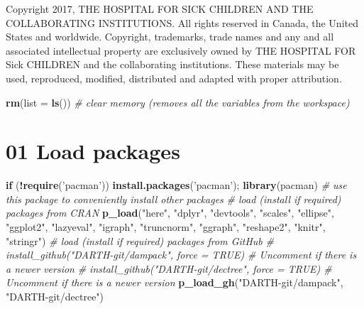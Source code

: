 \documentclass[
]{article}
\newenvironment{Shaded}{\begin{snugshade}}{\end{snugshade}}
\newcommand{\CommentTok}[1]{\textcolor[rgb]{0.56,0.35,0.01}{\textit{#1}}}
\newcommand{\ControlFlowTok}[1]{\textcolor[rgb]{0.13,0.29,0.53}{\textbf{#1}}}
\newcommand{\DataTypeTok}[1]{\textcolor[rgb]{0.13,0.29,0.53}{#1}}
\newcommand{\KeywordTok}[1]{\textcolor[rgb]{0.13,0.29,0.53}{\textbf{#1}}}
\newcommand{\NormalTok}[1]{#1}
\newcommand{\OperatorTok}[1]{\textcolor[rgb]{0.81,0.36,0.00}{\textbf{#1}}}
\newcommand{\StringTok}[1]{\textcolor[rgb]{0.31,0.60,0.02}{#1}}
\begin{document}
Copyright 2017, THE HOSPITAL FOR SICK CHILDREN AND THE COLLABORATING
INSTITUTIONS. All rights reserved in Canada, the United States and
worldwide. Copyright, trademarks, trade names and any and all associated
intellectual property are exclusively owned by THE HOSPITAL FOR Sick
CHILDREN and the collaborating institutions. These materials may be
used, reproduced, modified, distributed and adapted with proper
attribution.

\newpage

\begin{Shaded}
\begin{Highlighting}[]
\KeywordTok{rm}\NormalTok{(}\DataTypeTok{list =} \KeywordTok{ls}\NormalTok{())      }\CommentTok{# clear memory (removes all the variables from the workspace)}
\end{Highlighting}
\end{Shaded}

\hypertarget{load-packages}{%
\section{01 Load packages}\label{load-packages}}

\begin{Shaded}
\begin{Highlighting}[]
\ControlFlowTok{if}\NormalTok{ (}\OperatorTok{!}\KeywordTok{require}\NormalTok{(}\StringTok{'pacman'}\NormalTok{)) }\KeywordTok{install.packages}\NormalTok{(}\StringTok{'pacman'}\NormalTok{); }\KeywordTok{library}\NormalTok{(pacman) }\CommentTok{# use this package to conveniently install other packages}
\CommentTok{# load (install if required) packages from CRAN}
\KeywordTok{p_load}\NormalTok{(}\StringTok{"here"}\NormalTok{, }\StringTok{"dplyr"}\NormalTok{, }\StringTok{"devtools"}\NormalTok{, }\StringTok{"scales"}\NormalTok{, }\StringTok{"ellipse"}\NormalTok{, }\StringTok{"ggplot2"}\NormalTok{, }\StringTok{"lazyeval"}\NormalTok{, }\StringTok{"igraph"}\NormalTok{, }\StringTok{"truncnorm"}\NormalTok{, }\StringTok{"ggraph"}\NormalTok{, }\StringTok{"reshape2"}\NormalTok{, }\StringTok{"knitr"}\NormalTok{, }\StringTok{"stringr"}\NormalTok{)                                             }
\CommentTok{# load (install if required) packages from GitHub}
\CommentTok{# install_github("DARTH-git/dampack", force = TRUE) # Uncomment if there is a newer version}
\CommentTok{# install_github("DARTH-git/dectree", force = TRUE) # Uncomment if there is a newer version}
\KeywordTok{p_load_gh}\NormalTok{(}\StringTok{"DARTH-git/dampack"}\NormalTok{, }\StringTok{"DARTH-git/dectree"}\NormalTok{)}
\end{Highlighting}
\end{Shaded}
\end{document}
